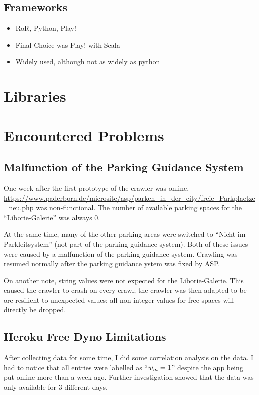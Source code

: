 \subsection{Frameworks}\label{sec:frameworks}

\begin{itemize}
  \item RoR, Python, Play!
  \item Final Choice was Play! with Scala
  \item Widely used, although not as widely as python
\end{itemize}

\section{Libraries}

\section{Encountered Problems}
\subsection{Malfunction of the Parking Guidance System}
One week after the first prototype of the crawler was online, \url{https://www.paderborn.de/microsite/asp/parken_in_der_city/freie_Parkplaetze_neu.php} was non-functional. The number of available parking spaces for the ``Liborie-Galerie'' was always \(0\).

At the same time, many of the other parking areas were switched to ``Nicht im Parkleitsystem'' (not part of the parking guidance system). Both of these issues were caused by a malfunction of the parking guidance system. Crawling was resumed normally after the parking guidance ystem was fixed by ASP.

On another note, string values were not expected for the Liborie-Galerie. This caused the crawler to crash on every crawl; the crawler was then adapted to be ore resilient to unexpected values: all non-integer values for free spaces will directly be dropped.

\subsection{Heroku Free Dyno Limitations}

After collecting data for some time, I did some correlation analysis on the data. I had to notice that all entries were labelled as ``\(w_m = 1\)'' despite the app being put online more than a week ago. Further investigation showed that the data was only available for 3 different days. 


